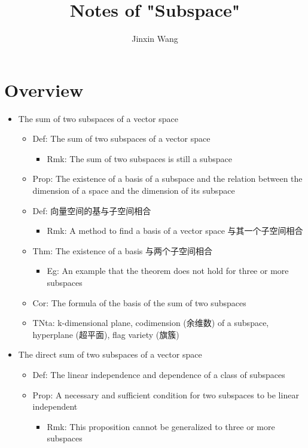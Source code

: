 \documentclass[onecolumn]{ctexart}
\title{Notes of "Subspace"}
\author{Jinxin Wang}
\date{}
\begin{document}
\maketitle

\section{Overview}
\begin{itemize}
  \item The sum of two subspaces of a vector space
  \begin{itemize}
    \item Def: The sum of two subspaces of a vector space
    \begin{itemize}
      \item Rmk: The sum of two subspaces is still a subspace
    \end{itemize}
    \item Prop: The existence of a basis of a subspace and the relation between the dimension of a space and the dimension of its subspace
    \item Def: 向量空间的基与子空间相合
    \begin{itemize}
      \item Rmk: A method to find a basis of a vector space 与其一个子空间相合
    \end{itemize}
    \item Thm: The existence of a basis 与两个子空间相合
    \begin{itemize}
      \item Eg: An example that the theorem does not hold for three or more subspaces
    \end{itemize}
    \item Cor: The formula of the basis of the sum of two subspaces
    \item TNta: k-dimensional plane, codimension (余维数) of a subspace, hyperplane (超平面), flag variety (旗簇)
  \end{itemize}
  \item The direct sum of two subspaces of a vector space
  \begin{itemize}
    \item Def: The linear independence and dependence of a class of subspaces
    \item Prop: A necessary and sufficient condition for two subspaces to be linear independent
    \begin{itemize}
      \item Rmk: This proposition cannot be generalized to three or more subspaces

\end{itemize}
\end{itemize}
\end{itemize}
\end{document}
